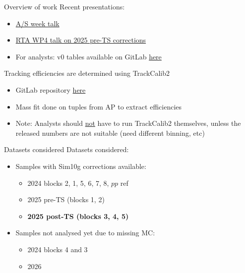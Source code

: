 \documentclass[xcolor={dvipsnames}]{beamer}
\begin{document}
\begin{frame}{Overview of work}
  \vspace{0.0cm}
  {Recent presentations:}
  \vspace{0.2cm}
  \begin{itemize}
    \setlength\itemsep{0.5em}
    \item{\href{https://indico.cern.ch/event/1675248/\#80-trackcalib-for-run-3}{A/S week talk}}
    \item{\href{https://indico.cern.ch/event/1577577/\#3-update-on-2025-and-2026-trac}{RTA WP4 talk on 2025 pre-TS corrections}}
    \item{For analysts: v0 tables available on GitLab \href{https://gitlab.cern.ch/lhcb-rta/tracking-efficiencies-run-3}{here}}
  \end{itemize}
  \vspace{0.5cm}
  {Tracking efficiencies are determined using TrackCalib2}
  \vspace{0.2cm}
  \begin{itemize}
    \setlength\itemsep{0.5em}
    \item{GitLab repository \href{https://gitlab.cern.ch/lhcb-rta/trackcalib2}{here}}
    \item{Mass fit done on tuples from AP to extract efficiencies}
    \item{Note: Analysts should \underline{not} have to run TrackCalib2 themselves, unless the released numbers are not suitable (need different binning, etc)}
  \end{itemize}
\end{frame}

\begin{frame}{Datasets considered}
  \vspace{0.0cm}
  {\large Datasets considered:}
  \vspace{0.2cm}
  \begin{itemize}
    \setlength\itemsep{1.0em}
    \item{Samples with Sim10g corrections available:}
    \begin{itemize}
      \item[-]{2024 blocks 2, 1, 5, 6, 7, 8, $pp$ ref}
      \item[-]{2025 pre-TS (blocks 1, 2)}
      \item[-]{\textbf{2025 post-TS (blocks 3, 4, 5)}}
    \end{itemize}
    \item{Samples not analysed yet due to missing MC:}
    \begin{itemize}
      \item[-]{2024 blocks 4 and 3}
      \item[-]{2026}
    \end{itemize}
  \end{itemize}
\end{frame}
\end{document}
